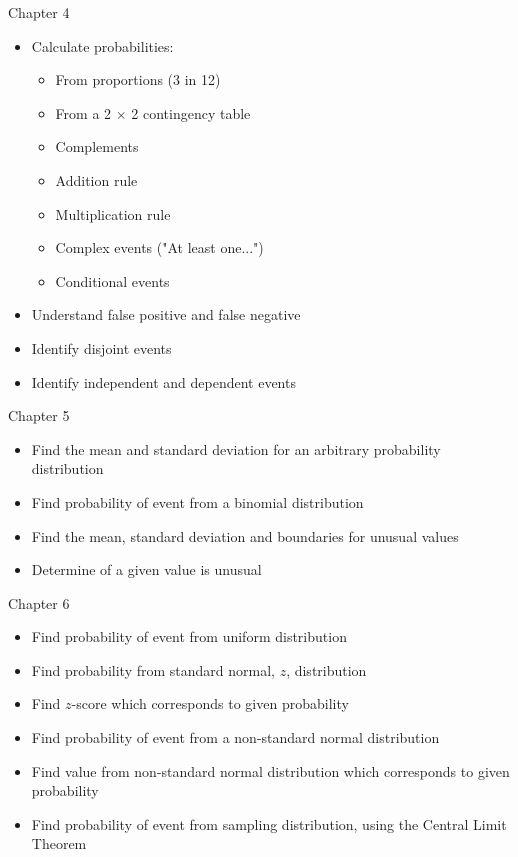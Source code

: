 \documentclass[xcolor=table]{beamer}
\begin{document}
\begin{frame}{Chapter 4}
\begin{block}{}
\large
\begin{itemize}
\item Calculate probabilities:
\begin{itemize}
\item From proportions (3 in 12)
\item From a 2 $\times$ 2 contingency table
\item Complements
\item Addition rule
\item Multiplication rule
\item Complex events ("At least one...")
\item Conditional events
\end{itemize}
\item Understand false positive and false negative
\item Identify disjoint events
\item Identify independent and dependent events
\end{itemize}
\end{block}
\end{frame}

\begin{frame}{Chapter 5}
\begin{block}{}
\large
\begin{itemize}
\item Find the mean and standard deviation for an arbitrary probability distribution
\item Find probability of event from a binomial distribution
\item Find the mean, standard deviation and boundaries for unusual values
\item Determine of a given value is unusual
\end{itemize}
\end{block}
\end{frame}

\begin{frame}{Chapter 6}
\begin{block}{}
\large
\begin{itemize}
\item Find probability of event from uniform distribution
\item Find probability from standard normal, $z$, distribution
\item Find $z$-score which corresponds to given probability
\item Find probability of event from a non-standard normal distribution
\item Find value from non-standard normal distribution which corresponds to given probability
\item Find probability of event from sampling distribution, using the Central Limit Theorem
\end{itemize}
\end{block}
\end{frame}
\end{document}
